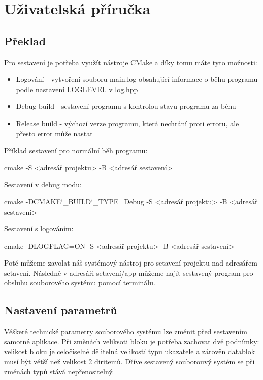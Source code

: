 \documentclass[12pt, a4paper]{report}
\begin{document}
\chapter{Uživatelská příručka}
\section{Překlad}
Pro sestavení je potřeba využít nástroje CMake a díky tomu máte tyto možnosti:
\begin{itemize}
 \item Logování - vytvoření souboru main.log obsahující informace o běhu programu podle nastaveni \ttfamily LOGLEVEL \normalfont v \ttfamily log.hpp \normalfont
 \item Debug build - sestavení programu s kontrolou stavu programu za běhu
 \item Release build - výchozí verze programu, která nechrání proti erroru, ale přesto error může nastat
\end{itemize}
Příklad sestavení pro normální běh programu:

\ttfamily cmake -S <adresář projektu> -B <adresář sestavení>

\normalfont
\noindent Sestavení v debug modu:

\ttfamily cmake -DCMAKE\char`_BUILD\char`_TYPE=Debug -S <adresář projektu> -B <adresář sestavení>

\normalfont
\noindent Sestavení s logováním:

\ttfamily cmake -DLOGFLAG=ON -S <adresář projektu> -B <adresář sestavení>

\normalfont
\noindent
Poté můžeme zavolat náš systémový nástroj pro setavení projektu nad adresářem setavení.
Následně v \ttfamily adresáři setavení/app \normalfont můžeme najít sestavený program pro obsluhu souborového systému pomocí terminálu.
\section{Nastavení parametrů}
Věškeré technické parametry souborového systému lze změnit před sestavením samotné aplikace. Při změnách veliksoti bloku je potřeba zachovat dvě podnímky: velikost bloku je celočíselně dělitelná velikostí typu ukazatele a zárověn datablok musí být větší než velikost 2 diritemů. Dříve sestavený souborouvý systém se při změnách typů stává nepřenositelný.
\end{document}
